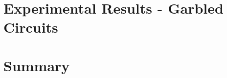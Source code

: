\section{Experimental Results - Garbled Circuits}
\label{ssec:ExperimentalResultsGC}

















\section{Summary}
\label{sec:SummaryEvaluation}


